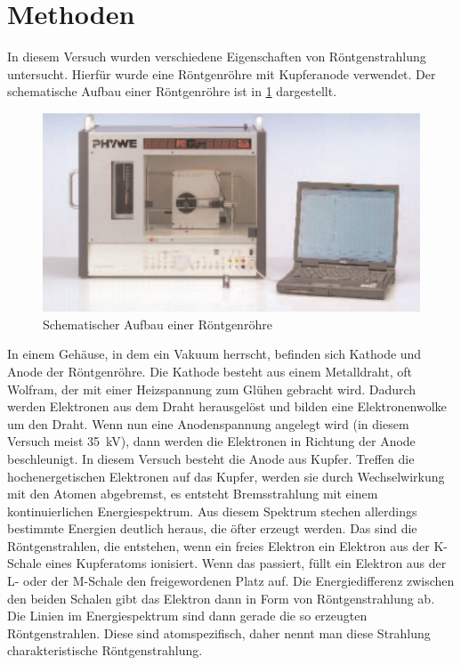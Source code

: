 \documentclass[
	a4paper,
	12pt,
	pagesize,
	ngerman
]{scrartcl}
\begin{document}
\section{Methoden}
\label{Methode}
In diesem Versuch wurden verschiedene Eigenschaften von Röntgenstrahlung untersucht. Hierfür wurde eine Röntgenröhre mit Kupferanode verwendet. Der schematische Aufbau einer Röntgenröhre ist in \cref{roentgen} dargestellt.
\begin{figure}[h!]
	\centering
	\includegraphics[scale = 1]{aufbau.png} %
	\caption{Schematischer Aufbau einer Röntgenröhre}
	\label{roentgen}
\end{figure}
In einem Gehäuse, in dem ein Vakuum herrscht, befinden sich Kathode und Anode der Röntgenröhre. Die Kathode besteht aus einem Metalldraht, oft Wolfram, der mit einer Heizspannung zum Glühen gebracht wird. Dadurch werden Elektronen aus dem Draht herausgelöst und bilden eine Elektronenwolke um den Draht. Wenn nun eine Anodenspannung angelegt wird (in diesem Versuch meist \SI{35}{kV}), dann werden die Elektronen in Richtung der Anode beschleunigt. In diesem Versuch besteht die Anode aus Kupfer. Treffen die hochenergetischen Elektronen auf das Kupfer, werden sie durch Wechselwirkung mit den Atomen abgebremst, es entsteht Bremsstrahlung mit einem kontinuierlichen Energiespektrum. Aus diesem Spektrum stechen allerdings bestimmte Energien deutlich heraus, die öfter erzeugt werden. Das sind die Röntgenstrahlen, die entstehen, wenn ein freies Elektron ein Elektron aus der K-Schale eines Kupferatoms ionisiert. Wenn das passiert, füllt ein Elektron aus der L- oder der M-Schale den freigewordenen Platz auf. Die Energiedifferenz zwischen den beiden Schalen gibt das Elektron dann in Form von Röntgenstrahlung ab. Die Linien im Energiespektrum sind dann gerade die so erzeugten Röntgenstrahlen. Diese sind atomspezifisch, daher nennt man diese Strahlung charakteristische Röntgenstrahlung.
\end{document}
